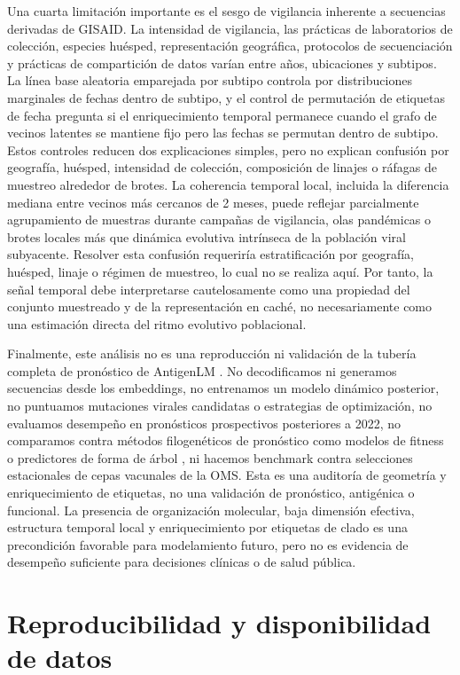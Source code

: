 \documentclass[11pt]{article}
\begin{document}
Una cuarta limitación importante es el sesgo de vigilancia inherente a secuencias derivadas de GISAID. La intensidad de vigilancia, las prácticas de laboratorios de colección, especies huésped, representación geográfica, protocolos de secuenciación y prácticas de compartición de datos varían entre años, ubicaciones y subtipos. La línea base aleatoria emparejada por subtipo controla por distribuciones marginales de fechas dentro de subtipo, y el control de permutación de etiquetas de fecha pregunta si el enriquecimiento temporal permanece cuando el grafo de vecinos latentes se mantiene fijo pero las fechas se permutan dentro de subtipo. Estos controles reducen dos explicaciones simples, pero no explican confusión por geografía, huésped, intensidad de colección, composición de linajes o ráfagas de muestreo alrededor de brotes. La coherencia temporal local, incluida la diferencia mediana entre vecinos más cercanos de 2 meses, puede reflejar parcialmente agrupamiento de muestras durante campañas de vigilancia, olas pandémicas o brotes locales más que dinámica evolutiva intrínseca de la población viral subyacente. Resolver esta confusión requeriría estratificación por geografía, huésped, linaje o régimen de muestreo, lo cual no se realiza aquí. Por tanto, la señal temporal debe interpretarse cautelosamente como una propiedad del conjunto muestreado y de la representación en caché, no necesariamente como una estimación directa del ritmo evolutivo poblacional.

Finalmente, este análisis no es una reproducción ni validación de la tubería completa de pronóstico de AntigenLM \cite{pei2026antigenlm}. No decodificamos ni generamos secuencias desde los embeddings, no entrenamos un modelo dinámico posterior, no puntuamos mutaciones virales candidatas o estrategias de optimización, no evaluamos desempeño en pronósticos prospectivos posteriores a 2022, no comparamos contra métodos filogenéticos de pronóstico como modelos de fitness o predictores de forma de árbol \cite{luksza2014fitness,neher2014predicting}, ni hacemos benchmark contra selecciones estacionales de cepas vacunales de la OMS. Esta es una auditoría de geometría y enriquecimiento de etiquetas, no una validación de pronóstico, antigénica o funcional. La presencia de organización molecular, baja dimensión efectiva, estructura temporal local y enriquecimiento por etiquetas de clado es una precondición favorable para modelamiento futuro, pero no es evidencia de desempeño suficiente para decisiones clínicas o de salud pública.

\section{Reproducibilidad y disponibilidad de datos}
\end{document}
